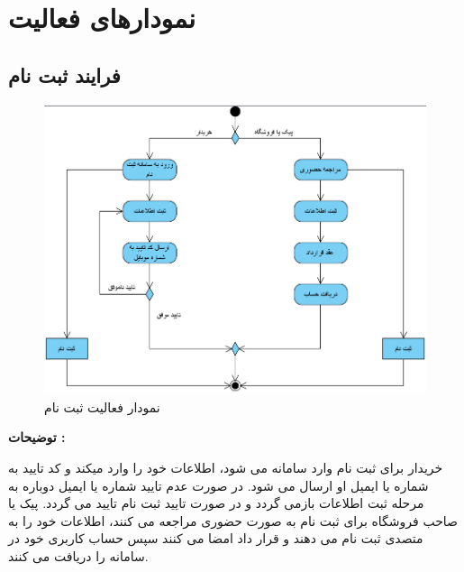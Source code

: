 \documentclass[12pt,a4paper]{article}
\begin{document}
\section{نمودارهای فعالیت} \label{section.activity}
	\subsection{فرایند ثبت نام} \label{section.activity.register}
		\begin{figure}[h!]
			\begin{center}
				\includegraphics[width=14cm]{images/Register Activity Diagram.png}
			\end{center}
			\caption{نمودار فعالیت ثبت نام}
		\end{figure}
	
	\textbf{توضیحات :} 
	
	
	خریدار برای ثبت نام وارد سامانه می شود، اطلاعات خود را وارد میکند و کد تایید به شماره یا ایمیل او ارسال می شود. در صورت عدم تایید شماره یا ایمیل دوباره به مرحله ثبت اطلاعات بازمی گردد و در صورت تایید ثبت نام تایید می گردد.	پیک یا صاحب فروشگاه برای ثبت نام به صورت حضوری مراجعه می کنند، اطلاعات خود را به متصدی ثبت نام می دهند و قرار داد امضا می کنند سپس حساب کاربری خود در سامانه را دریافت می کنند.
\pagebreak	
\end{document}
